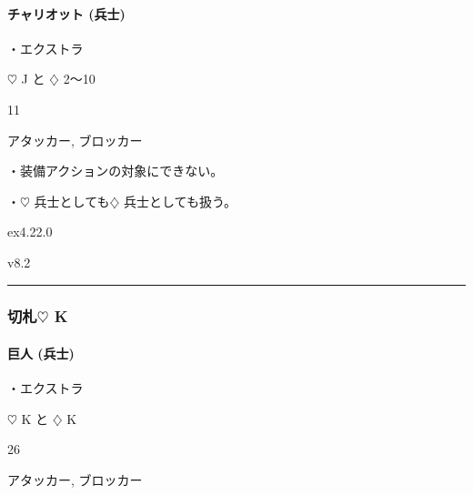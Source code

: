 \documentclass[letterpaper,10pt,dvipdfmx]{sphinxmanual}
\begin{document}
\paragraph{チャリオット (兵士)}
\label{\detokenize{auto/frameActionlist:char-chariot}}\label{\detokenize{auto/frameActionlist:id92}}
\sphinxAtStartPar
{}

\sphinxAtStartPar
・エクストラ

\sphinxAtStartPar
{} {\normalsize $\heartsuit$} J と {\normalsize $\diamondsuit$} 2〜10

\sphinxAtStartPar
{} 11

\sphinxAtStartPar
{} アタッカー, ブロッカー

\sphinxAtStartPar
{}

\sphinxAtStartPar
・装備アクションの対象にできない。

\sphinxAtStartPar
・{\normalsize $\heartsuit$} 兵士としても{\normalsize $\diamondsuit$} 兵士としても扱う。

\sphinxAtStartPar
{}  ex4.22.0

\sphinxAtStartPar
{}  v8.2


\bigskip\hrule\bigskip



\subsubsection{切札{\normalsize $\heartsuit$} K}
\label{\detokenize{auto/frameActionlist:id93}}

\paragraph{巨人 (兵士)}
\label{\detokenize{auto/frameActionlist:char-giant}}\label{\detokenize{auto/frameActionlist:id94}}
\sphinxAtStartPar
{}

\sphinxAtStartPar
・エクストラ

\sphinxAtStartPar
{} {\normalsize $\heartsuit$} K と {\normalsize $\diamondsuit$} K

\sphinxAtStartPar
{} 26

\sphinxAtStartPar
{} アタッカー, ブロッカー

\sphinxAtStartPar
{}
\end{document}
